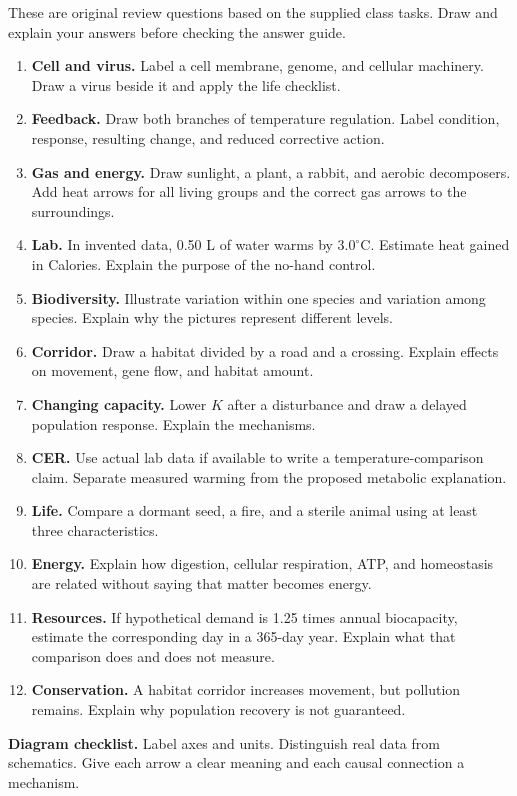 These are original review questions based on the supplied class tasks. Draw and explain your answers before checking the answer guide.
\begin{enumerate}
\item \textbf{Cell and virus.} Label a cell membrane, genome, and cellular machinery. Draw a virus beside it and apply the life checklist.
\item \textbf{Feedback.} Draw both branches of temperature regulation. Label condition, response, resulting change, and reduced corrective action.
\item \textbf{Gas and energy.} Draw sunlight, a plant, a rabbit, and aerobic decomposers. Add heat arrows for all living groups and the correct gas arrows to the surroundings.
\item \textbf{Lab.} In invented data, 0.50 L of water warms by $3.0^\circ$C. Estimate heat gained in Calories. Explain the purpose of the no-hand control.
\item \textbf{Biodiversity.} Illustrate variation within one species and variation among species. Explain why the pictures represent different levels.
\item \textbf{Corridor.} Draw a habitat divided by a road and a crossing. Explain effects on movement, gene flow, and habitat amount.
\item \textbf{Changing capacity.} Lower $K$ after a disturbance and draw a delayed population response. Explain the mechanisms.
\item \textbf{CER.} Use actual lab data if available to write a temperature-comparison claim. Separate measured warming from the proposed metabolic explanation.
\item \textbf{Life.} Compare a dormant seed, a fire, and a sterile animal using at least three characteristics.
\item \textbf{Energy.} Explain how digestion, cellular respiration, ATP, and homeostasis are related without saying that matter becomes energy.
\item \textbf{Resources.} If hypothetical demand is 1.25 times annual biocapacity, estimate the corresponding day in a 365-day year. Explain what that comparison does and does not measure.
\item \textbf{Conservation.} A habitat corridor increases movement, but pollution remains. Explain why population recovery is not guaranteed.
\end{enumerate}
\textbf{Diagram checklist.} Label axes and units. Distinguish real data from schematics. Give each arrow a clear meaning and each causal connection a mechanism.

